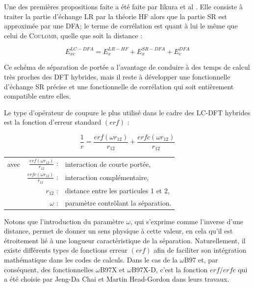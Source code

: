 Une des premières propositions faite a été faite par Iikura et al \cite{iikura2001long}. Elle consiste à traiter la partie d'échange LR par la théorie HF alors que la partie SR est approximée par une DFA; le terme de corrélation est quant à lui le même que celui de \textsc{Coulomb}, quelle que soit la distance :

\begin{equation}
E_{xc}^{LC-DFA} = E_{x}^{LR-HF} + E_{x}^{SR-DFA} + E_{c}^{DFA}
\end{equation}

Ce schéma de séparation de portée a l'avantage de conduire à des temps de calcul très proches des DFT hybrides, mais il reste à développer une fonctionnelle d'échange SR précise et une fonctionnelle de corrélation qui soit entièrement compatible entre elles.

Le type d'opérateur de coupure le plus utilisé dans le cadre des LC-DFT hybrides est la fonction d'erreur standard $(erf)$ :

\begin{equation}
\frac{1}{r} = \frac{erf(\omega r_{12})}{r_{12}} + \frac{erfc(\omega r_{12})}{r_{12}}
\label{erf}
\end{equation}

\begin{flushleft}
\begin{tabular}{@{}lrp{10cm}}
avec & $\frac{erf(\omega r_{12})}{r_{12}}$ : & interaction de courte portée, \\
& $\frac{erfc(\omega r_{12})}{r_{12}}$ : & interaction complémentaire, \\
& $r_{12}$ : & distance entre les particules 1 et 2, \\
& $\omega$ : & paramètre contrôlant la séparation.
\end{tabular}
\end{flushleft}

Notons que l'introduction du paramètre $\omega$, qui s'exprime comme l'inverse d'une distance, permet de donner un sens physique à cette valeur, en cela qu'il est étroitement lié à une longueur caractéristique de la séparation.
Naturellement, il existe différents types de fonctions erreur $(erf)$ afin de faciliter son intégration mathématique dans les codes de calculs. Dans le cas de la $\omega$B97 \cite{chai2008long} et, par conséquent, des fonctionnelles $\omega$B97X et $\omega$B97X-D, c'est la fonction $erf/erfc$ qui a été choisie par Jeng-Da Chai et Martin Head-Gordon dans leurs travaux. \\


